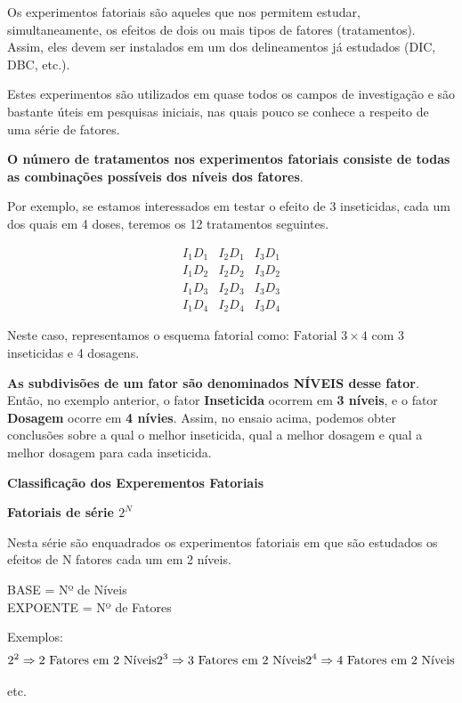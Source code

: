 \documentclass[
]{book}
\begin{document}
Os experimentos fatoriais são aqueles que nos permitem estudar, simultaneamente, os efeitos de dois ou mais tipos de fatores (tratamentos). Assim, eles devem ser instalados em um dos delineamentos já estudados (DIC, DBC, etc.).

Estes experimentos são utilizados em quase todos os campos de investigação e são bastante úteis em pesquisas iniciais, nas quais pouco se conhece a respeito de uma série de fatores.

\textbf{O número de tratamentos nos experimentos fatoriais consiste de todas as combinações possíveis dos níveis dos fatores}.

Por exemplo, se estamos interessados em testar o efeito de 3 inseticidas, cada um dos quais em 4 doses, teremos os 12 tratamentos seguintes.

\[
\begin{array}{} 
I_1 D_1  & I_2D_1  & I_3D_1 \\
I_1D_2  & I_2D_2  & I_3D_2 \\
I_1D_3  & I_2D_3  & I_3D_3 \\ 
I_1D_4  & I_2D_4  & I_3D_4 \end{array}
\]

Neste caso, representamos o esquema fatorial como: \(\text{Fatorial }3 \times 4\) com 3 inseticidas e 4 dosagens.

\textbf{As subdivisões de um fator são denominados NÍVEIS desse fator}. Então, no exemplo anterior, o fator \textbf{Inseticida} ocorrem em \textbf{3 níveis}, e o fator \textbf{Dosagem} ocorre em \textbf{4 nívies}. Assim, no ensaio acima, podemos obter conclusões sobre a qual o melhor inseticida, qual a melhor dosagem e qual a melhor dosagem para cada inseticida.

\textbf{Classificação dos Experementos Fatoriais}

\textbf{Fatoriais de série \(2^N\)}

Nesta série são enquadrados os experimentos fatoriais em que são estudados os efeitos de N fatores cada um em 2 níveis.

BASE = Nº de Níveis\\
EXPOENTE = Nº de Fatores

Exemplos:
\[
2^2 \Rightarrow \text{2 Fatores em 2 Níveis} \\
2^3 \Rightarrow \text{3 Fatores em 2 Níveis} \\
2^4 \Rightarrow \text{4 Fatores em 2 Níveis} \\
\]

etc.
\end{document}
